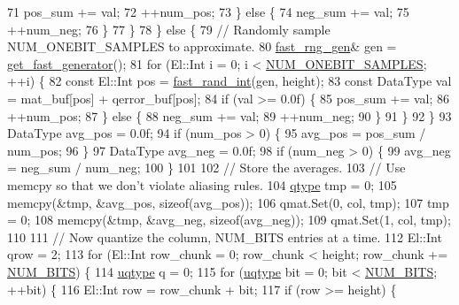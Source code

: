 \begin{DoxyCode}
71           pos\_sum += val;
72           ++num\_pos;
73         \} \textcolor{keywordflow}{else} \{
74           neg\_sum += val;
75           ++num\_neg;
76         \}
77       \}
78     \} \textcolor{keywordflow}{else} \{
79       \textcolor{comment}{// Randomly sample NUM\_ONEBIT\_SAMPLES to approximate.}
80       \hyperlink{namespacelbann_af16616ffa6a3616836eabadd6ce837ec}{fast\_rng\_gen}& gen = \hyperlink{namespacelbann_ae6ce9c2fdec6f81803f6b1a6555c31c5}{get\_fast\_generator}();
81       \textcolor{keywordflow}{for} (El::Int i = 0; i < \hyperlink{classlbann_1_1lbann__quantizer_a8e25785452736c54861a69207a48252d}{NUM\_ONEBIT\_SAMPLES}; ++i) \{
82         \textcolor{keyword}{const} El::Int pos = \hyperlink{namespacelbann_a557aaed6267e7aaf583a75149e9c670c}{fast\_rand\_int}(gen, height);
83         \textcolor{keyword}{const} DataType val = mat\_buf[pos] + qerror\_buf[pos];
84         \textcolor{keywordflow}{if} (val >= 0.0f) \{
85           pos\_sum += val;
86           ++num\_pos;
87         \} \textcolor{keywordflow}{else} \{
88           neg\_sum += val;
89           ++num\_neg;
90         \}
91       \}
92     \}
93     DataType avg\_pos = 0.0f;
94     \textcolor{keywordflow}{if} (num\_pos > 0) \{
95       avg\_pos = pos\_sum / num\_pos;
96     \}
97     DataType avg\_neg = 0.0f;
98     \textcolor{keywordflow}{if} (num\_neg > 0) \{
99       avg\_neg = neg\_sum / num\_neg;
100     \}
101 
102     \textcolor{comment}{// Store the averages.}
103     \textcolor{comment}{// Use memcpy so that we don't violate aliasing rules.}
104     \hyperlink{classlbann_1_1lbann__quantizer_afcda642ff1b44d31eec910909c3d013e}{qtype} tmp = 0;
105     memcpy(&tmp, &avg\_pos, \textcolor{keyword}{sizeof}(avg\_pos));
106     qmat.Set(0, col, tmp);
107     tmp = 0;
108     memcpy(&tmp, &avg\_neg, \textcolor{keyword}{sizeof}(avg\_neg));
109     qmat.Set(1, col, tmp);
110 
111     \textcolor{comment}{// Now quantize the column, NUM\_BITS entries at a time.}
112     El::Int qrow = 2;
113     \textcolor{keywordflow}{for} (El::Int row\_chunk = 0; row\_chunk < height; row\_chunk += \hyperlink{classlbann_1_1lbann__quantizer_a33ea17392f53b90e91aea1ffb7e11d68}{NUM\_BITS}) \{
114       \hyperlink{classlbann_1_1lbann__quantizer_ac8b63c86fc871e248ce20c7af19a7fad}{uqtype} q = 0;
115       \textcolor{keywordflow}{for} (\hyperlink{classlbann_1_1lbann__quantizer_ac8b63c86fc871e248ce20c7af19a7fad}{uqtype} bit = 0; bit < \hyperlink{classlbann_1_1lbann__quantizer_a33ea17392f53b90e91aea1ffb7e11d68}{NUM\_BITS}; ++bit) \{
116         El::Int row = row\_chunk + bit;
117         \textcolor{keywordflow}{if} (row >= height) \{

\end{DoxyCode}
